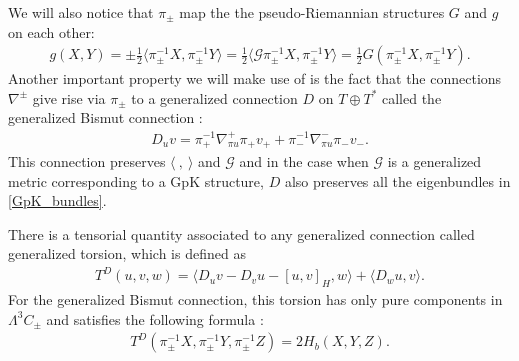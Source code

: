 \documentclass[letterpaper,12pt]{article}
\newcommand{\TT}{{T\oplus T^*}}
\newcommand{\JJ}{\mathcal{J}}
\newcommand{\GG}{\mathcal{G}}
\newcommand{\n}{\nabla}
\newcommand{\se}{\Gamma}
\newcommand{\la}{\langle}
\newcommand{\ra}{\rangle}
\newcommand{\lara}{\la\ ,\ \ra}
\theoremstyle{definition}
\theoremstyle{remark}
\theoremstyle{examples}
\begin{document}
We will also notice that $\pi_\pm$ map the the pseudo-Riemannian structures $G$ and $g$ on each other:
\begin{align}\label{pi:gG_relationship}
g(X,Y)=\pm\frac{1}{2}\la \pi_\pm^{-1}X,\pi_\pm^{-1}Y\ra = \frac{1}{2}\la \GG \pi_\pm^{-1}X,\pi_\pm^{-1}Y\ra =\frac{1}{2}G(\pi_\pm^{-1}X,\pi_\pm^{-1}Y).
\end{align}
Another important property we will make use of is the fact that the connections $\n^\pm$ give rise via $\pi_\pm$ to a generalized connection $D$ on $\TT$ called the generalized Bismut connection \cite{Gualtieri:2007bq}:
\begin{align}\label{genBismut_pi_nabla_pm}
D_uv=\pi^{-1}_+\n^+_{\pi u}\pi_+ v_++\pi^{-1}_-\n^-_{\pi u}\pi_- v_-.
\end{align}
This connection preserves $\lara$ and $\GG$ and in the case when $\GG$ is a generalized metric corresponding to a GpK structure, $D$ also preserves all the eigenbundles in \eqref{GpK_bundles}. 

There is a tensorial quantity associated to any generalized connection called generalized torsion, which is defined as \cite{Gualtieri:2007bq}
\begin{align}\label{gentorsion_def}
T^D(u,v,w)=\la D_uv-D_vu-[u,v]_H,w\ra +\la D_wu,v\ra.
\end{align}
For the generalized Bismut connection, this torsion has only pure components in $\Lambda^3C_\pm$ and satisfies the following formula \cite[Prop.~2.29]{Hu:2019zro}:
\begin{align}\label{gentorsion_H}
T^D(\pi_\pm^{-1}X,\pi_\pm^{-1}Y,\pi_\pm^{-1}Z)=2H_b(X,Y,Z).
\end{align}


\end{document}
